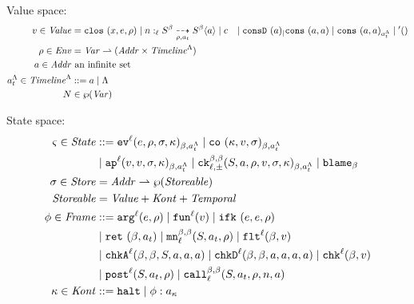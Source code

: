 \documentclass[preprint,onecolumn,9pt]{sigplanconf} %
\begin{document}
Value space:
\begin{align*}
  \mval \in \Value &=
    \clos{\mvar, \mexp, \menv}
   \alt \blclos{\mname}{\mmlab}{\mmlab}{\mlab}{\mscon}{\mscon}{\menv}{\mtimeline}{\maddr}
   \alt \mconstant
&  \alt \vconsf{\maddr}
   \alt \vcons{\maddr}{\maddr}
   \alt \vconst{\maddr}{\maddr}{\mstimeline}
   \alt \sunit \\
  \menv \in \Env &= \Var \parto (\Addr \times \Timeline^{\toplevel}) \\
  \maddr \in \Addr &\text{ an infinite set} \\
  \mstimeline \in \Timeline^{\toplevel} &::= \maddr \alt \toplevel \\
  \mnames &\in \wp(\Var) \\
\end{align*}

State space:
\begin{align*}
  \mstate \in \State &::=
      \ev[^\mlab]{\mexp, \menv, \msto, \mkont}{\msmlab}{\mstimeline}
 \alt \co{\mkont, \mval, \msto}{\msmlab}{\mstimeline} \\
&\alt \ap[^\mlab]{\mval, \mval, \msto, \mkont}{\msmlab}{\mstimeline}
 \alt \ck{\mmlab}{\mmlab}{\mlab}{\pm}{\mscon, \maddr, \menv, \mval, \msto, \mkont}{\msmlab}{\mstimeline}
 \alt \sblame{\mmlab} \\
\msto \in \Store &= \Addr \parto \wp(\Storeable) \\
\Storeable &= \Value + \Kont + \TContract \\
\mframe \in \Frame &::=
      \kar[^\mlab]{\mexp,\menv}
 \alt \kfn[^\mlab]{\mval}
 \alt \kif{\mexp, \mexp, \menv} \\
&\alt \krt{\mmlab, \mtimeline}
 \alt \kmon{\mmlab}{\mmlab}{\mlab}{\mscon, \mtimeline, \menv}
 \alt \kflat[^\mlab]{\mmlab, \mval} \\
&\alt \kchkA[^\mlab]{\mmlab, \mmlab, \mscon, \maddr, \maddr, \maddr}
 \alt \kchkD[^\mlab]{\mmlab, \mmlab, \maddr, \maddr, \maddr, \maddr}
 \alt \kcheck[^\mlab]{\mmlab, \mval} \\
&\alt \kpost[^\mlab]{\mscon, \mtimeline, \menv}
 \alt \kmcall{\mmlab}{\mmlab}{\mlab}{\mscon, \mtimeline, \menv, \mname, \maddr} \\
\mkont \in \Kont &::= \kmt \alt \spush{\mframe}{\mkaddr}
\end{align*}
\end{document}
